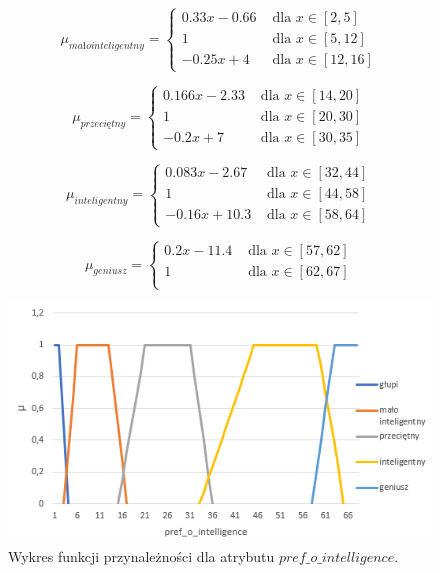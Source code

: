 \documentclass{classrep}
\begin{document}
\begin{enumerate}
  \begin{equation}
    \mu_{mało inteligentny} =
      \begin{cases}
        0.33x-0.66 & \text{ dla } x \in [2,5]\\
        1 & \text{ dla } x \in [5,12] \\
        -0.25x+4 & \text{ dla } x \in [12,16]       
      \end{cases}  
  \end{equation}

  \begin{equation}
    \mu_{przeciętny} =
      \begin{cases}
        0.166x-2.33 & \text{ dla } x \in [14,20]\\
        1 & \text{ dla } x \in [20,30] \\
        -0.2x+7 & \text{ dla } x \in [30,35]       
      \end{cases}  
  \end{equation}

  \begin{equation}
    \mu_{inteligentny} =
      \begin{cases}
        0.083x-2.67 & \text{ dla } x \in [32,44]\\
        1 & \text{ dla } x \in [44,58] \\
        -0.16x+10.3 & \text{ dla } x \in [58,64]       
      \end{cases}  
  \end{equation}

  \begin{equation}
    \mu_{geniusz} =
      \begin{cases}
        0.2x-11.4 & \text{ dla } x \in [57,62] \\
        1 & \text{ dla } x \in [62,67] \\   
      \end{cases}  
  \end{equation}
  
  \begin{figure}
    \includegraphics{fp_poi.png}
    \caption{Wykres funkcji przynależności dla atrybutu \(pref\_o\_intelligence\).}
    \end{figure}


\end{enumerate}
\end{document}
